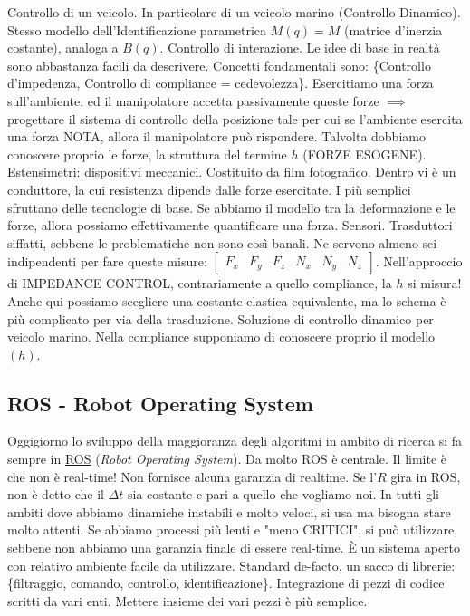 Controllo di un veicolo. In particolare di un veicolo marino (Controllo Dinamico). Stesso modello dell'Identificazione parametrica $M(q)=M$ (matrice d'inerzia costante), analoga a $B(q)$. Controllo di interazione. Le idee di base in realtà sono abbastanza facili da descrivere. Concetti fondamentali sono: \{Controllo d'impedenza, Controllo di compliance = cedevolezza\}. Esercitiamo una forza sull'ambiente, ed il manipolatore accetta passivamente queste forze $\implies$ progettare il sistema di controllo della posizione tale per cui se l'ambiente esercita una forza NOTA, allora il manipolatore può rispondere. Talvolta dobbiamo conoscere proprio le forze, la struttura del termine $h$ (FORZE ESOGENE). Estensimetri: dispositivi meccanici. Costituito da film fotografico. Dentro vi è un conduttore, la cui resistenza dipende dalle forze esercitate. I più semplici sfruttano delle tecnologie di base. Se abbiamo il modello tra la deformazione e le forze, allora possiamo effettivamente quantificare una forza. Sensori. Trasduttori siffatti, sebbene le problematiche non sono così banali. Ne servono almeno sei indipendenti per fare queste misure: $\begin{bmatrix}F_x&F_y&F_z&N_x&N_y&N_z\end{bmatrix}$. Nell'approccio di IMPEDANCE CONTROL, contrariamente a quello compliance, la $h$ si misura! Anche qui possiamo scegliere una costante elastica equivalente, ma lo schema è più complicato per via della trasduzione. Soluzione di controllo dinamico per veicolo marino. Nella compliance supponiamo di conoscere proprio il modello $(h)$.

\subsection{ROS - Robot Operating System}

Oggigiorno lo sviluppo della maggioranza degli algoritmi in ambito di ricerca si fa sempre in \underline{ROS} (\textit{Robot Operating System}). Da molto ROS è centrale. Il limite è che non è real-time! Non fornisce alcuna garanzia di realtime. Se l'$R$ gira in ROS, non è detto che il $\Delta t$ sia costante e pari a quello che vogliamo noi. In tutti gli ambiti dove abbiamo dinamiche instabili e molto veloci, si usa ma bisogna stare molto attenti. Se abbiamo processi più lenti e "meno CRITICI", si può utilizzare, sebbene non abbiamo una garanzia finale di essere real-time. \`E un sistema aperto con relativo ambiente facile da utilizzare. Standard de-facto, un sacco di librerie: \{filtraggio, comando, controllo, identificazione\}. Integrazione di pezzi di codice scritti da vari enti. Mettere insieme dei vari pezzi è più semplice.

